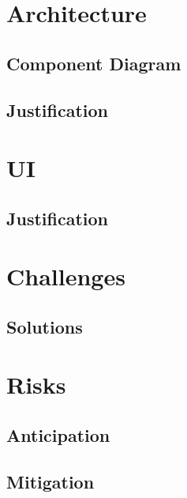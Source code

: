 \section{Architecture}
\subsection{Component Diagram}
\subsection{Justification}
\section{UI}
\subsection{Justification}

\section{Challenges}
\subsection{Solutions}

\section{Risks}
\subsection{Anticipation}
\subsection{Mitigation}
